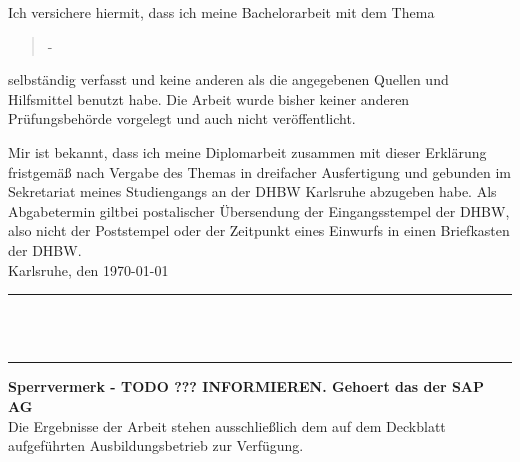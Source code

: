 Ich versichere hiermit, dass ich meine Bachelorarbeit mit dem Thema
\begin{quote}
\textit{\titel} -\textit{ \untertitel }
\end{quote}
selbständig verfasst und keine anderen als die angegebenen Quellen und Hilfsmittel benutzt habe. Die Arbeit wurde bisher keiner anderen Prüfungsbehörde vorgelegt und auch nicht veröffentlicht.


Mir ist bekannt, dass ich meine Diplomarbeit zusammen mit dieser Erklärung fristgemäß nach Vergabe des Themas in dreifacher Ausfertigung und gebunden im Sekretariat meines Studiengangs an der DHBW Karlsruhe abzugeben habe. Als Abgabetermin giltbei postalischer Übersendung der Eingangsstempel der DHBW, also nicht der Poststempel oder der Zeitpunkt eines
Einwurfs in einen Briefkasten der DHBW.\\[10ex]

Karlsruhe, den \today \\[4ex]


\rule[-0.2cm]{5cm}{0.5pt} \\

\textsc{\autor} \\[10ex]

\hrule 
\vspace*{1.0cm}
\noindent \textbf{\Large{Sperrvermerk - TODO ??? INFORMIEREN. Gehoert das der SAP AG}}\\
\normalsize
Die Ergebnisse der Arbeit stehen ausschließlich dem auf dem Deckblatt aufgeführten Ausbildungsbetrieb zur Verfügung.